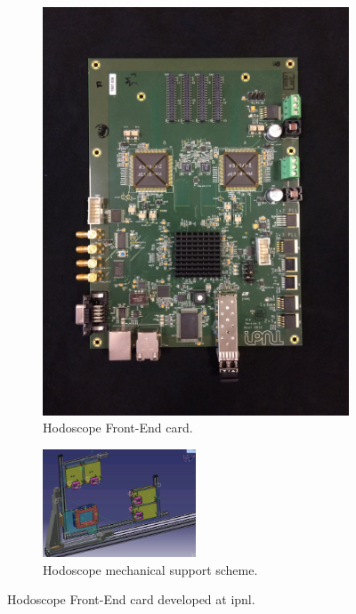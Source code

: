 \begin{figure}
\begin{subfigure}[t]{.3\textwidth}
\centering
\includegraphics[width=1\textwidth]{03_GraphicFiles/chapter3_CLaRySproto/Hodoscope/HodoCard1.jpg}
\caption{Hodoscope Front-End card.}
\label{chap3::fig::HodoscopeFEcard}
\end{subfigure}
\begin{subfigure}[t]{.7\textwidth}
\centering
\includegraphics[width=0.5\textwidth]{03_GraphicFiles/chapter3_CLaRySproto/Hodoscope/HodoScheme.png}
\caption{Hodoscope mechanical support scheme.}
\label{chap3::fig::HodoscopeSchemeMech}
\end{subfigure}
\caption{Hodoscope Front-End card developed at \gls{ipnl}.}
\label{chap3::fig::HodoPic}
\end{figure}

